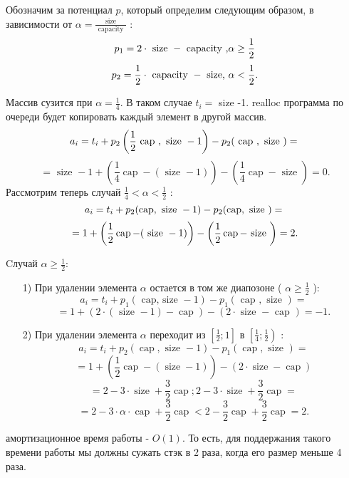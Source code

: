 \documentclass{article}
\begin{document}
    Обозначим за потенциал $p$, который определим следующим образом, в зависимости от $\alpha=\frac{\text { size }}{\text { capacity }}$ :
    $$
        p_1 =2 \cdot \text{ size }- \text{ capacity ,} \alpha \geq \frac{1}{2} \\
    $$
    $$
        p_2=\frac{1}{2} \cdot \text { capacity }- \text { size, } \alpha<\frac{1}{2}.\\
    $$
    
    Массив сузится при $\alpha=\frac{1}{4}$. В таком случае $t_i=$ size -1. realloc программа по очереди будет копировать каждый элемент в другой массив.
    $$
    a_i=t_i+ p_2\left(\frac{1}{2} \text { cap }, \text { size }-1\right)-p_2(\text { cap }, \text { size })=\\
    $$
    $$
    = \text { size }-1+\left(\frac{1}{4} \operatorname{cap}-(\text { size }-1)\right)-\left(\frac{1}{4} \operatorname{cap}-\text { size }\right)=0 .
    $$
    Рассмотрим теперь случай $\frac{1}{4}<\alpha<\frac{1}{2}$ :
    $$
    a_i=t_i+p_2(\operatorname{cap}, \text { size }-1)-p_2(\operatorname{cap}, \text { size })=\\$$
    $$
    = 1+\left(\frac{1}{2} \operatorname{cap}-(\text { size }-1)\right)-\left(\frac{1}{2} \operatorname{cap}-\text { size }\right)=2\\.
    $$
    
    Cлучай $\alpha \geq \frac{1}{2}$:
    \begin{itemize}
    
    \item[1)] При удалении элемента $\alpha$ остается в том же диапозоне ( $\alpha \geq \frac{1}{2}$ ):\\
    $$
    a_i=t_i+p_1(\text { cap, size }-1)-p_1(\text { cap }, \text { size })= $$
    $$ = 1+(2 \cdot(\text { size }-1)-\operatorname{cap})-(2 \cdot \text { size }- \text { cap })=-1 .
    $$
    \item[2)]При удалении элемента $\alpha$ переходит из $\left[\frac{1}{2} ; 1\right]$ в $\left[\frac{1}{4} ; \frac{1}{2}\right)$ :
    $$
    a_i=t_i+p_2(\operatorname{cap}, \text { size }-1)-p_1(\operatorname{cap}, \text { size }) = $$
    $$ = 1+\left(\frac{1}{2} \operatorname{cap}-(\operatorname{size}-1)\right)-(2 \cdot \operatorname{size}-\operatorname{cap})$$
    $$ = 2-3 \cdot \operatorname{size}+\frac{3}{2} \operatorname{cap} ; 
    2-3 \cdot \operatorname{size}+\frac{3}{2} \operatorname{cap} = $$
    $$ = 2-3 \cdot \alpha \cdot \operatorname{cap}+\frac{3}{2} \operatorname{cap}<2-\frac{3}{2} \operatorname{cap}+\frac{3}{2} \operatorname{cap}=2 .

    $$
\end{itemize}
    амортизационное время работы - $O(1)$.
    То есть, для поддержания такого времени работы мы должны сужать стэк в 2 раза, когда его размер меньше 4 раза.
\end{document}
